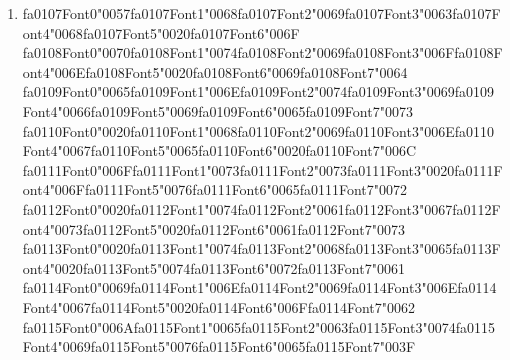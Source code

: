 \documentclass[12pt]{article}
\begin{document}
\begin{enumerate}[label=Q\arabic*.]
 \item {\csname fa0107Font0\endcsname\char"0057}{\csname fa0107Font1\endcsname\char"0068}{\csname fa0107Font2\endcsname\char"0069}{\csname fa0107Font3\endcsname\char"0063}{\csname fa0107Font4\endcsname\char"0068}{\csname fa0107Font5\endcsname\char"0020}{\csname fa0107Font6\endcsname\char"006F} {\csname fa0108Font0\endcsname\char"0070}{\csname fa0108Font1\endcsname\char"0074}{\csname fa0108Font2\endcsname\char"0069}{\csname fa0108Font3\endcsname\char"006F}{\csname fa0108Font4\endcsname\char"006E}{\csname fa0108Font5\endcsname\char"0020}{\csname fa0108Font6\endcsname\char"0069}{\csname fa0108Font7\endcsname\char"0064} {\csname fa0109Font0\endcsname\char"0065}{\csname fa0109Font1\endcsname\char"006E}{\csname fa0109Font2\endcsname\char"0074}{\csname fa0109Font3\endcsname\char"0069}{\csname fa0109Font4\endcsname\char"0066}{\csname fa0109Font5\endcsname\char"0069}{\csname fa0109Font6\endcsname\char"0065}{\csname fa0109Font7\endcsname\char"0073} {\csname fa0110Font0\endcsname\char"0020}{\csname fa0110Font1\endcsname\char"0068}{\csname fa0110Font2\endcsname\char"0069}{\csname fa0110Font3\endcsname\char"006E}{\csname fa0110Font4\endcsname\char"0067}{\csname fa0110Font5\endcsname\char"0065}{\csname fa0110Font6\endcsname\char"0020}{\csname fa0110Font7\endcsname\char"006C} {\csname fa0111Font0\endcsname\char"006F}{\csname fa0111Font1\endcsname\char"0073}{\csname fa0111Font2\endcsname\char"0073}{\csname fa0111Font3\endcsname\char"0020}{\csname fa0111Font4\endcsname\char"006F}{\csname fa0111Font5\endcsname\char"0076}{\csname fa0111Font6\endcsname\char"0065}{\csname fa0111Font7\endcsname\char"0072} {\csname fa0112Font0\endcsname\char"0020}{\csname fa0112Font1\endcsname\char"0074}{\csname fa0112Font2\endcsname\char"0061}{\csname fa0112Font3\endcsname\char"0067}{\csname fa0112Font4\endcsname\char"0073}{\csname fa0112Font5\endcsname\char"0020}{\csname fa0112Font6\endcsname\char"0061}{\csname fa0112Font7\endcsname\char"0073} {\csname fa0113Font0\endcsname\char"0020}{\csname fa0113Font1\endcsname\char"0074}{\csname fa0113Font2\endcsname\char"0068}{\csname fa0113Font3\endcsname\char"0065}{\csname fa0113Font4\endcsname\char"0020}{\csname fa0113Font5\endcsname\char"0074}{\csname fa0113Font6\endcsname\char"0072}{\csname fa0113Font7\endcsname\char"0061} {\csname fa0114Font0\endcsname\char"0069}{\csname fa0114Font1\endcsname\char"006E}{\csname fa0114Font2\endcsname\char"0069}{\csname fa0114Font3\endcsname\char"006E}{\csname fa0114Font4\endcsname\char"0067}{\csname fa0114Font5\endcsname\char"0020}{\csname fa0114Font6\endcsname\char"006F}{\csname fa0114Font7\endcsname\char"0062} {\csname fa0115Font0\endcsname\char"006A}{\csname fa0115Font1\endcsname\char"0065}{\csname fa0115Font2\endcsname\char"0063}{\csname fa0115Font3\endcsname\char"0074}{\csname fa0115Font4\endcsname\char"0069}{\csname fa0115Font5\endcsname\char"0076}{\csname fa0115Font6\endcsname\char"0065}{\csname fa0115Font7\endcsname\char"003F}

\end{enumerate}
\end{document}
